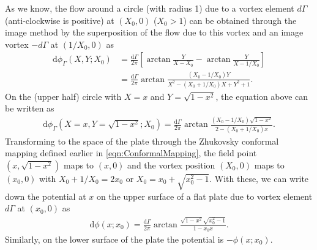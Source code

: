 As we know, the flow around a circle (with radius 1) due to a vortex element $d\Gamma$ (anti-clockwise is positive) at $(X_0, 0)$ ($X_0 > 1$) can be obtained through the image method by the superposition of the flow due to this vortex and an image vortex $-d\Gamma$ at $(1/X_0,0)$ as
\begin{align}
\mathrm{d}\phi_\Gamma (X,Y; X_0) & = \frac{\mathrm{d}\Gamma}{2\pi}[\arctan \frac{Y}{X-X_0} - \arctan \frac{Y}{X-1/X_0}]  \\
            & =  \frac{\mathrm{d}\Gamma}{2\pi}\arctan \frac{(X_0-1/X_0)Y}{X^2-(X_0+1/X_0)X+Y^2+1}.
\end{align}
On the (upper half) circle with $X = x$ and $Y = \sqrt{1-x^2}$, the equation above can be written as
\begin{align}
\mathrm{d}\phi_\Gamma (X = x,Y = \sqrt{1-x^2}; X_0)  =  \frac{\mathrm{d}\Gamma}{2\pi}\arctan \frac{(X_0-1/X_0)\sqrt{1-x^2}}{2-(X_0+1/X_0)x}.
\end{align}
Transforming to the space of the plate through the Zhukovsky conformal mapping defined earlier in \eqref{eqn:ConformalMapping}, the field point $(x, \sqrt{1-x^2})$ maps to $(x, 0)$ and the vortex position $(X_0, 0)$ maps to $(x_0, 0)$ with $X_0 + 1/X_0 = 2x_0$ or $X_0 = x_0 + \sqrt{x_0^2-1}$.
With these, we can write down the potential at $x$ on the upper surface of a flat plate due to vortex element $d\Gamma$ at $(x_0, 0)$ as
\begin{align}
\mathrm{d}\phi (x; x_0) = \frac{\mathrm{d}\Gamma}{2\pi} \arctan \frac{\sqrt{1-x^2}\sqrt{x_0^2-1}}{1-x_0x}.
\end{align}
Similarly, on the lower surface of the plate the potential is $-\phi(x; x_0)$.

